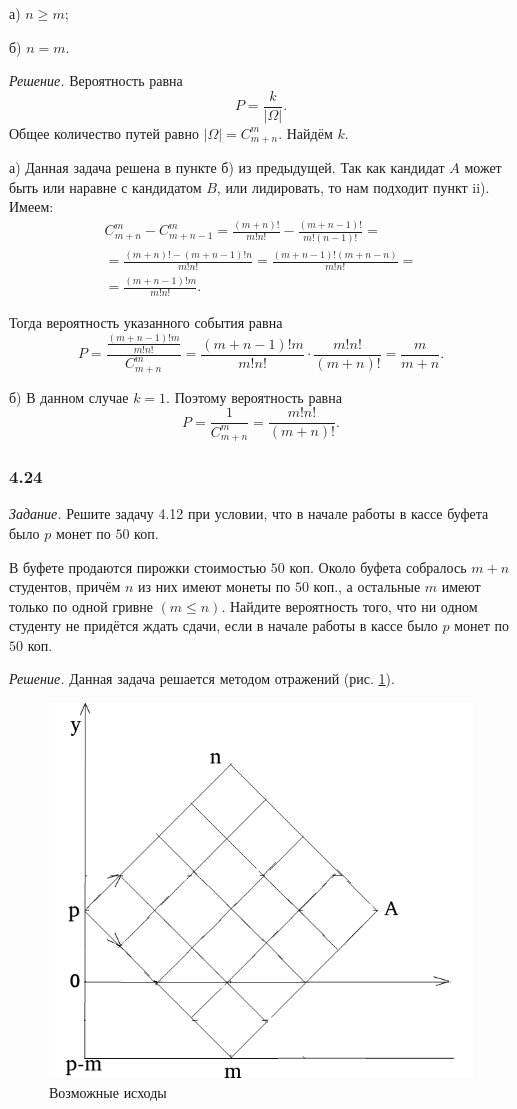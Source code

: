 \documentclass{book}
\begin{document}
а) $n \geq m$;

б) $n = m$.
 
\textit{Решение.} Вероятность равна
$$P =
\frac{k}{| \Omega |}.$$
Общее количество путей равно $| \Omega| = C_{m+n}^m$.
Найдём $k$.

а) Данная задача решена в пункте б) из предыдущей.
Так как кандидат $A$ может быть или наравне с кандидатом $B$, или лидировать, то нам подходит пункт ii).
Имеем:
\begin{equation*}
\begin{split}
C_{m+n}^m - C_{m+n-1}^m =
\frac{ \left( m+n \right)!}{m! n!} - \frac{ \left( m+n-1 \right)!}{m! \left( n-1 \right)!} = \\
= \frac{ \left( m+n \right)! - \left( m+n-1 \right)!n}{m!n!} =
\frac{ \left( m+n-1 \right)! \left( m+n-n \right) }{m!n!} = \\
= \frac{ \left( m+n-1 \right)! m}{m!n!}.
\end{split}
\end{equation*}

Тогда вероятность указанного события равна
$$P =
\frac{\frac{ \left( m+n-1 \right)! m}{m!n!}}{C_{m+n}^m} =
\frac{ \left( m+n-1 \right)! m}{m!n!} \cdot \frac{m!n!}{ \left( m+n \right)!} =
\frac{m}{m+n}.$$

б) В данном случае $k = 1$.
Поэтому вероятность равна
$$P =
\frac{1}{C_{m+n}^m} =
\frac{m!n!}{ \left( m+n \right)!}.$$

\subsubsection*{4.24}

\textit{Задание.} Решите задачу 4.12 при условии, что в начале работы в кассе буфета было $p$ монет по $50$ коп.

В буфете продаются пирожки стоимостью $50$ коп.
Около буфета собралось $m+n$ студентов,
причём $n$ из них имеют монеты по $50$ коп., а остальные $m$ имеют только по одной гривне $ \left( m \leq n \right) $.
Найдите вероятность того, что ни одном студенту не придётся ждать сдачи,
если в начале работы в кассе было $p$ монет по $50$ коп. 

\textit{Решение.} Данная задача решается методом отражений (рис. \ref{fig:423}).

\begin{figure}[h!]
  \centering
  \includegraphics[width=.6\textwidth]{./pictures/4_23.png}
  \caption{Возможные исходы}
  \label{fig:423}
\end{figure}
\end{document}
